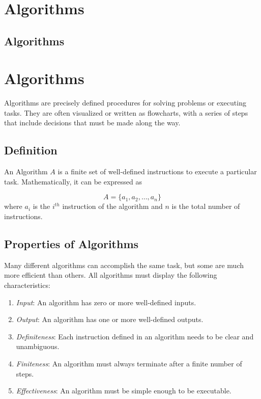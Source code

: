 \section{Algorithms}
\subsection{Algorithms}


\section{Algorithms}

Algorithms are precisely defined procedures for solving problems or executing tasks. They are often visualized or written as flowcharts, with a series of steps that include decisions that must be made along the way.

\subsection{Definition}

An Algorithm $A$ is a finite set of well-defined instructions to execute a particular task. Mathematically, it can be expressed as 

\[A = \{a_1, a_2, \dots, a_n\}\]
where $a_i$ is the $i^{th}$ instruction of the algorithm and $n$ is the total number of instructions.

\subsection{Properties of Algorithms}

Many different algorithms can accomplish the same task, but some are much more efficient than others. All algorithms must display the following characteristics:

\begin{enumerate}
\item \textit{Input}: An algorithm has zero or more well-defined inputs.
\item \textit{Output}: An algorithm has one or more well-defined outputs.
\item \textit{Definiteness}: Each instruction defined in an algorithm needs to be clear and unambiguous.
\item \textit{Finiteness}: An algorithm must always terminate after a finite number of steps.
\item \textit{Effectiveness}: An algorithm must be simple enough to be executable.
\end{enumerate}

